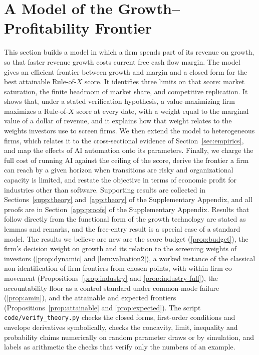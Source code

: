 \section{A Model of the Growth--Profitability Frontier}\label{sec:model}

This section builds a model in which a firm spends part of its revenue on growth, so that faster revenue growth costs current free cash flow margin. The model gives an efficient frontier between growth and margin and a closed form for the best attainable Rule-of-$X$ score. It identifies three limits on that score: market saturation, the finite headroom of market share, and competitive replication. It shows that, under a stated verification hypothesis, a value-maximizing firm maximizes a Rule-of-$X$ score at every date, with a weight equal to the marginal value of a dollar of revenue, and it explains how that weight relates to the weights investors use to screen firms. We then extend the model to heterogeneous firms, which relates it to the cross-sectional evidence of Section~\ref{sec:empirics}, and map the effects of AI automation onto its parameters. Finally, we charge the full cost of running AI against the ceiling of the score, derive the frontier a firm can reach by a given horizon when transitions are risky and organizational capacity is limited, and restate the objective in terms of economic profit for industries other than software. Supporting results are collected in Sections~\ref{supp:theory} and~\ref{app:theory} of the Supplementary Appendix, and all proofs are in Section~\ref{app:proofs} of the Supplementary Appendix. Results that follow directly from the functional form of the growth technology are stated as lemmas and remarks, and the free-entry result is a special case of a standard model. The results we believe are new are the score budget (\autoref{prop:budget}), the firm's decision weight on growth and its relation to the screening weights of investors (\autoref{prop:dynamic} and \autoref{lem:valuation2}), a worked instance of the classical non-identification of firm frontiers from chosen points, with within-firm co-movement (Propositions~\ref{prop:industry} and \ref{prop:industry-full}), the accountability floor as a control standard under common-mode failure (\autoref{prop:amin}), and the attainable and expected frontiers (Propositions~\ref{prop:attainable} and \ref{prop:expected}). The script \texttt{code/verify\_theory.py} checks the closed forms, first-order conditions and envelope derivatives symbolically, checks the concavity, limit, inequality and probability claims numerically on random parameter draws or by simulation, and labels as arithmetic the checks that verify only the numbers of an example.

